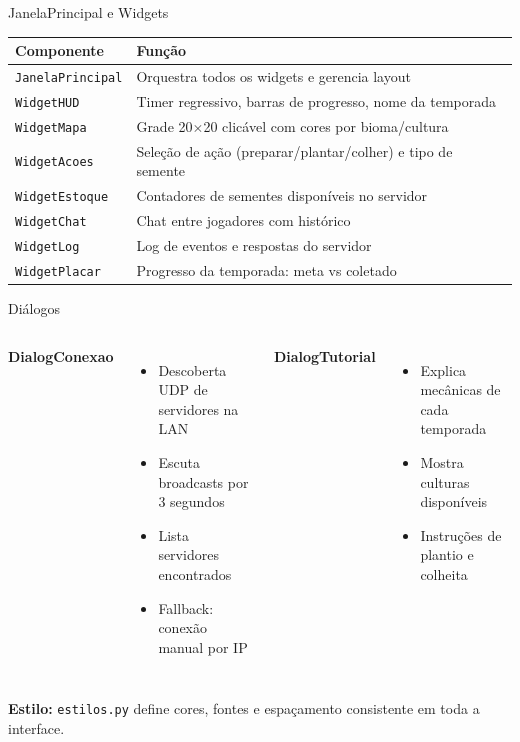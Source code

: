 \documentclass[aspectratio=169]{beamer}
\begin{document}
\begin{frame}{JanelaPrincipal e Widgets}
  \footnotesize
  \begin{tabular}{>{\raggedright\arraybackslash}p{2.8cm}>{\raggedright\arraybackslash}p{9cm}}
    \toprule
    \textbf{Componente} & \textbf{Fun\c{c}\~ao} \\
    \midrule
    \texttt{JanelaPrincipal} & Orquestra todos os widgets e gerencia layout \\
    \texttt{WidgetHUD} & Timer regressivo, barras de progresso, nome da temporada \\
    \texttt{WidgetMapa} & Grade 20$\times$20 clic\'avel com cores por bioma/cultura \\
    \texttt{WidgetAcoes} & Sele\c{c}\~ao de a\c{c}\~ao (preparar/plantar/colher) e tipo de semente \\
    \texttt{WidgetEstoque} & Contadores de sementes dispon\'iveis no servidor \\
    \texttt{WidgetChat} & Chat entre jogadores com hist\'orico \\
    \texttt{WidgetLog} & Log de eventos e respostas do servidor \\
    \texttt{WidgetPlacar} & Progresso da temporada: meta vs coletado \\
    \bottomrule
  \end{tabular}
\end{frame}

\begin{frame}{Di\'alogos}
  \begin{columns}
    \textbf{DialogConexao}
    \begin{itemize}
      \item Descoberta UDP de servidores na LAN
      \item Escuta broadcasts por 3 segundos
      \item Lista servidores encontrados
      \item Fallback: conex\~ao manual por IP
    \end{itemize}
    \textbf{DialogTutorial}
    \begin{itemize}
      \item Explica mec\^anicas de cada temporada
      \item Mostra culturas dispon\'iveis
      \item Instru\c{c}\~oes de plantio e colheita
    \end{itemize}
  \end{columns}
  \vfill
  \textbf{Estilo:} \texttt{estilos.py} define cores, fontes e espa\c{c}amento consistente em toda a interface.
\end{frame}
\end{document}
